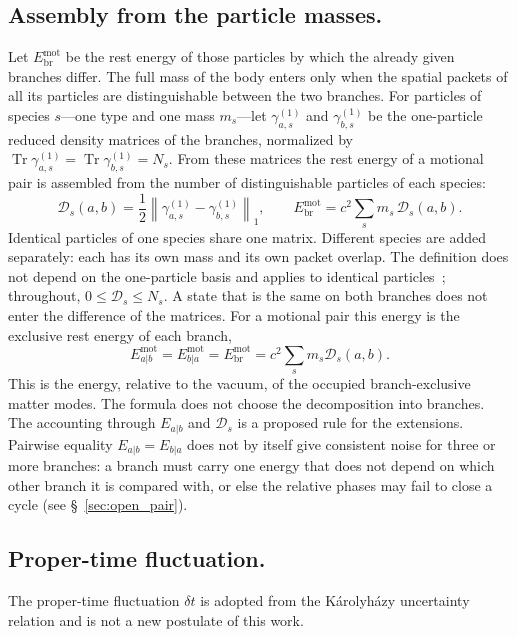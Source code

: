 \documentclass[11pt,a4paper]{article}
\begin{document}
\subsection{Assembly from the particle masses.}
\label{sec:particle_count}
Let $E_{\mathrm{br}}^{\mathrm{mot}}$ be the rest energy of those particles by which the already given branches differ. The full mass of the body enters only when the spatial packets of all its particles are distinguishable between the two branches. For particles of species $s$---one type and one mass $m_s$---let $\gamma^{(1)}_{a,s}$ and $\gamma^{(1)}_{b,s}$ be the one-particle reduced density matrices of the branches, normalized by $\operatorname{Tr}\gamma^{(1)}_{a,s}=\operatorname{Tr}\gamma^{(1)}_{b,s}=N_s$. From these matrices the rest energy of a motional pair is assembled from the number of distinguishable particles of each species:
\begin{equation}
\mathcal D_s(a,b)=\frac12\left\|\gamma^{(1)}_{a,s}-\gamma^{(1)}_{b,s}\right\|_1,
\qquad
E_{\mathrm{br}}^{\mathrm{mot}}=c^2\sum_s m_s\,\mathcal D_s(a,b).
\label{eq:ebr_dist}
\end{equation}
Identical particles of one species share one matrix. Different species are added separately: each has its own mass and its own packet overlap. The definition does not depend on the one-particle basis and applies to identical particles~\cite{korsbakken2007}; throughout, $0\le\mathcal D_s\le N_s$. A state that is the same on both branches does not enter the difference of the matrices. For a motional pair this energy is the exclusive rest energy of each branch,
\begin{equation}
E_{a|b}^{\mathrm{mot}}
=E_{b|a}^{\mathrm{mot}}
=E_{\mathrm{br}}^{\mathrm{mot}}
=c^2\sum_s m_s\mathcal D_s(a,b).
\label{eq:exclusive_energy}
\end{equation}
This is the energy, relative to the vacuum, of the occupied branch-exclusive matter modes. The formula does not choose the decomposition into branches. The accounting through $E_{a|b}$ and $\mathcal D_s$ is a proposed rule for the extensions. Pairwise equality $E_{a|b}=E_{b|a}$ does not by itself give consistent noise for three or more branches: a branch must carry one energy that does not depend on which other branch it is compared with, or else the relative phases may fail to close a cycle (see \S~\ref{sec:open_pair}).

\subsection{Proper-time fluctuation.}
The proper-time fluctuation $\delta t$ is adopted from the K\'arolyh\'azy uncertainty relation and is not a new postulate of this work.
\end{document}
